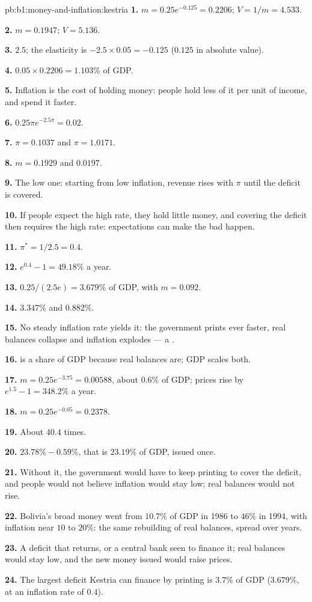 \begin{solution}{pb:b1:money-and-inflation:kestria}
\textbf{1.} $m = 0.25e^{-0.125} = 0.2206$; $V = 1/m = 4.533$.

\textbf{2.} $m = 0.1947$; $V = 5.136$.

\textbf{3.} $2.5$; the elasticity is $-2.5 \times 0.05 = -0.125$ ($0.125$ in absolute value).

\textbf{4.} $0.05 \times 0.2206 = 1.103\%$ of GDP.

\textbf{5.} Inflation is the cost of holding money: people hold less of it
per unit of income, and spend it faster.

\textbf{6.} $0.25\pi e^{-2.5\pi} = 0.02$.

\textbf{7.} $\pi = 0.1037$ and $\pi = 1.0171$.

\textbf{8.} $m = 0.1929$ and $0.0197$.

\textbf{9.} The low one: starting from low inflation, revenue rises with $\pi$
until the deficit is covered.

\textbf{10.} If people expect the high rate, they hold little money, and
covering the deficit then requires the high rate: expectations can make the
bad  happen.

\textbf{11.} $\pi^* = 1/2.5 = 0.4$.

\textbf{12.} $e^{0.4} - 1 = 49.18\%$ a year.

\textbf{13.} $0.25/(2.5e) = 3.679\%$ of GDP, with $m = 0.092$.

\textbf{14.} $3.347\%$ and $0.882\%$.

\textbf{15.} No steady inflation rate yields it: the government prints ever
faster, real balances collapse and inflation explodes --- a .

\textbf{16.}  is a share of GDP because real balances are; GDP
scales both.

\textbf{17.} $m = 0.25e^{-3.75} = 0.00588$, about $0.6\%$ of GDP; prices rise by
$e^{1.5} - 1 = 348.2\%$ a year.

\textbf{18.} $m = 0.25e^{-0.05} = 0.2378$.

\textbf{19.} About $40.4$ times.

\textbf{20.} $23.78\% - 0.59\%$, that is $23.19\%$ of GDP, issued once.

\textbf{21.} Without it, the government would have to keep printing to cover
the deficit, and people would not believe inflation would stay low; real
balances would not rise.

\textbf{22.} Bolivia's broad money went from $10.7\%$ of GDP in 1986 to $46\%$ in
1994, with inflation near $10$ to $20\%$: the same rebuilding of real
balances, spread over years.

\textbf{23.} A deficit that returns, or a central bank seen to finance it;
real balances would stay low, and the new money issued would raise prices.

\textbf{24.} The largest deficit Kestria can finance by printing is $3.7\%$ of
GDP ($3.679\%$, at an inflation rate of $0.4$).
\end{solution}
